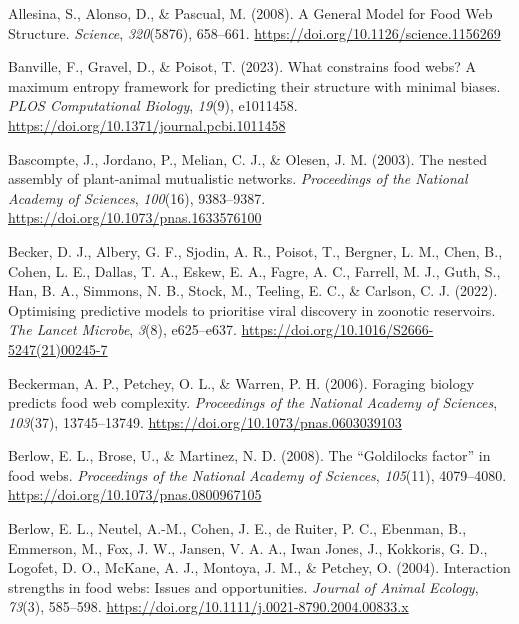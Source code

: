 \documentclass[
]{article}
\newlength{\cslhangindent}
\newenvironment{CSLReferences}[2] %
 {\begin{list}{}{%
  \setlength{\itemindent}{0pt}
  \setlength{\leftmargin}{0pt}
  \setlength{\parsep}{0pt}
  \ifodd #1
   \setlength{\leftmargin}{\cslhangindent}
   \setlength{\itemindent}{-1\cslhangindent}
  \fi
  \setlength{\itemsep}{#2\baselineskip}}}
 {\end{list}}
\begin{document}
\label{refs}
\begin{CSLReferences}{1}{0}
Allesina, S., Alonso, D., \& Pascual, M. (2008). A {General Model} for
{Food Web Structure}. \emph{Science}, \emph{320}(5876), 658--661.
\url{https://doi.org/10.1126/science.1156269}

Banville, F., Gravel, D., \& Poisot, T. (2023). What constrains food
webs? {A} maximum entropy framework for predicting their structure with
minimal biases. \emph{PLOS Computational Biology}, \emph{19}(9),
e1011458. \url{https://doi.org/10.1371/journal.pcbi.1011458}

Bascompte, J., Jordano, P., Melian, C. J., \& Olesen, J. M. (2003). The
nested assembly of plant-animal mutualistic networks. \emph{Proceedings
of the National Academy of Sciences}, \emph{100}(16), 9383--9387.
\url{https://doi.org/10.1073/pnas.1633576100}

Becker, D. J., Albery, G. F., Sjodin, A. R., Poisot, T., Bergner, L. M.,
Chen, B., Cohen, L. E., Dallas, T. A., Eskew, E. A., Fagre, A. C.,
Farrell, M. J., Guth, S., Han, B. A., Simmons, N. B., Stock, M.,
Teeling, E. C., \& Carlson, C. J. (2022). Optimising predictive models
to prioritise viral discovery in zoonotic reservoirs. \emph{The Lancet
Microbe}, \emph{3}(8), e625--e637.
\url{https://doi.org/10.1016/S2666-5247(21)00245-7}

Beckerman, A. P., Petchey, O. L., \& Warren, P. H. (2006). Foraging
biology predicts food web complexity. \emph{Proceedings of the National
Academy of Sciences}, \emph{103}(37), 13745--13749.
\url{https://doi.org/10.1073/pnas.0603039103}

Berlow, E. L., Brose, U., \& Martinez, N. D. (2008). The {``{Goldilocks}
factor''} in food webs. \emph{Proceedings of the National Academy of
Sciences}, \emph{105}(11), 4079--4080.
\url{https://doi.org/10.1073/pnas.0800967105}

Berlow, E. L., Neutel, A.-M., Cohen, J. E., de Ruiter, P. C., Ebenman,
B., Emmerson, M., Fox, J. W., Jansen, V. A. A., Iwan Jones, J.,
Kokkoris, G. D., Logofet, D. O., McKane, A. J., Montoya, J. M., \&
Petchey, O. (2004). Interaction strengths in food webs: Issues and
opportunities. \emph{Journal of Animal Ecology}, \emph{73}(3), 585--598.
\url{https://doi.org/10.1111/j.0021-8790.2004.00833.x}


\end{CSLReferences}
\end{document}
